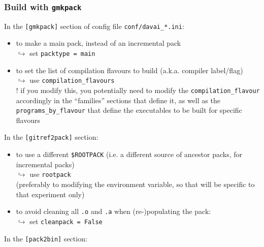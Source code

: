 \documentclass[a4paper,10pt,twoside]{article}
\begin{document}
\subsubsection{Build with \texttt{gmkpack}}
In the \texttt{[gmkpack]} section of config file \texttt{conf/davai\_*.ini}:
\begin{itemize}
 \item to make a main pack, instead of an incremental pack\\
 $\hookrightarrow$ set \texttt{packtype = main}
 \item to set the list of compilation flavours to build (a.k.a. compiler label/flag)\\
 $\hookrightarrow$ use \texttt{compilation\_flavours}\\
 ! if you modify this, you potentially need to modify the \texttt{compilation\_flavour} accordingly in the ``families'' sections that define it, as well as the \texttt{programs\_by\_flavour} that define the executables to be built for specific flavours
\end{itemize}
In the \texttt{[gitref2pack]} section:
\begin{itemize}
 \item to use a different \texttt{\$ROOTPACK} (i.e. a different source of ancestor packs, for incremental packs)\\
 $\hookrightarrow$ use \texttt{rootpack}\\
 (preferably to modifying the environment variable, so that will be specific to that experiment only)
 \item to avoid cleaning all \texttt{.o} and \texttt{.a} when (re-)populating the pack:\\
 $\hookrightarrow$ set \texttt{cleanpack = False}\\
\end{itemize}
In the \texttt{[pack2bin]} section:
\end{document}
